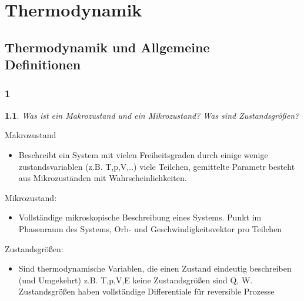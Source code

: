 \documentclass[12pt,a4paper]{report}
\author{\theauthor}
\title{\thetitle}
\newtheorem{myfrag}{}%
\begin{document}
\maketitle%
\tableofcontents%
\chapter{Thermodynamik}
\section{Thermodynamik und Allgemeine\\Definitionen}
\subsection{1}
\begin{myfrag}
Was ist ein Makrozustand und ein Mikrozustand?
Was sind Zustandsgrößen?
\end{myfrag} \qquad \newline
Makrozustand 
\begin{itemize}
\item Beschreibt ein System mit vielen Freiheitsgraden durch einige wenige zustandsvariablen (z.B. T,p,V,..) viele Teilchen, gemittelte Parametr besteht aus Mikrozuständen mit Wahrscheinlichkeiten.
\end{itemize}
Mikrozustand:
\begin{itemize}
\item Vollständige mikroskopische Beschreibung eines Systems. Punkt im Phasenraum des Systems, Orb- und Geschwindigkeitsvektor pro Teilchen
\end{itemize}
Zustandsgrößen:
\begin{itemize}
\item Sind thermodynamische Variablen, die einen Zustand eindeutig beschreiben (und Umgekehrt)
z.B. T,p,V,E keine Zustandsgrößen sind Q, W. Zustandsgrößen haben vollständige Differentiale für reversible Prozesse
\end{itemize}
\end{document}
